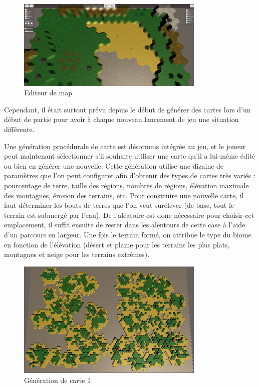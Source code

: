 \documentclass[12pt]{report}
\begin{document}
\begin{figure}[H]
    \centering
    \includegraphics[width=0.8\textwidth]{EditorScreen}
    \caption{Editeur de map}
\end{figure}

Cependant, il était surtout prévu depuis le début de générer des cartes lors
d'un début de partie pour avoir à chaque nouveau lancement de jeu une situation
différente.

Une génération procédurale de carte est désormais intégrée au jeu, et le joueur
peut maintenant sélectionner s'il souhaite utiliser une carte qu'il a lui-même
édité ou bien en générer une nouvelle. Cette génération utilise une dizaine de
paramètres que l'on peut configurer afin d'obtenir des types de cartes très
variés : pourcentage de terre, taille des régions, nombres de régions, élévation
maximale des montagnes, érosion des terrains, etc. Pour construire une nouvelle
carte, il faut déterminer les bouts de terres que l'on veut surélever (de base,
tout le terrain est submergé par l'eau). De l'aléatoire est donc nécessaire pour
choisir cet emplacement, il suffit ensuite de rester dans les alentours de cette
case à l'aide d'un parcours en largeur. Une fois le terrain formé, on attribue
le type du biome en fonction de l'élévation (désert et plaine pour les terrains
les plus plats, montagnes et neige pour les terrains extrêmes).

\begin{figure}[H]
    \centering
    \includegraphics[width=0.8\textwidth]{MapGen1}
    \caption{Génération de carte 1}
\end{figure}
\end{document}
